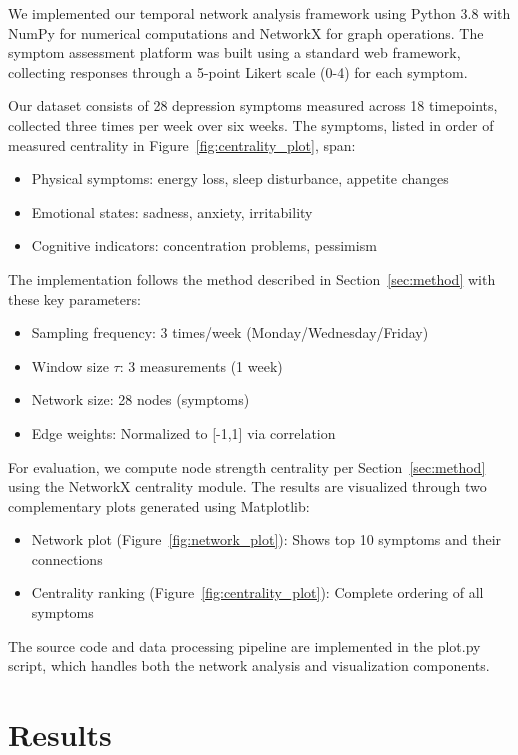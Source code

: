 \documentclass{article} %
\begin{document}
We implemented our temporal network analysis framework using Python 3.8 with NumPy for numerical computations and NetworkX for graph operations. The symptom assessment platform was built using a standard web framework, collecting responses through a 5-point Likert scale (0-4) for each symptom.

Our dataset consists of 28 depression symptoms measured across 18 timepoints, collected three times per week over six weeks. The symptoms, listed in order of measured centrality in Figure~\ref{fig:centrality_plot}, span:
\begin{itemize}
    \item Physical symptoms: energy loss, sleep disturbance, appetite changes
    \item Emotional states: sadness, anxiety, irritability
    \item Cognitive indicators: concentration problems, pessimism
\end{itemize}

The implementation follows the method described in Section~\ref{sec:method} with these key parameters:
\begin{itemize}
    \item Sampling frequency: 3 times/week (Monday/Wednesday/Friday)
    \item Window size $\tau$: 3 measurements (1 week)
    \item Network size: 28 nodes (symptoms)
    \item Edge weights: Normalized to [-1,1] via correlation
\end{itemize}

For evaluation, we compute node strength centrality per Section~\ref{sec:method} using the NetworkX centrality module. The results are visualized through two complementary plots generated using Matplotlib:
\begin{itemize}
    \item Network plot (Figure~\ref{fig:network_plot}): Shows top 10 symptoms and their connections
    \item Centrality ranking (Figure~\ref{fig:centrality_plot}): Complete ordering of all symptoms
\end{itemize}

The source code and data processing pipeline are implemented in the plot.py script, which handles both the network analysis and visualization components.

\section{Results}
\label{sec:results}
\end{document}
